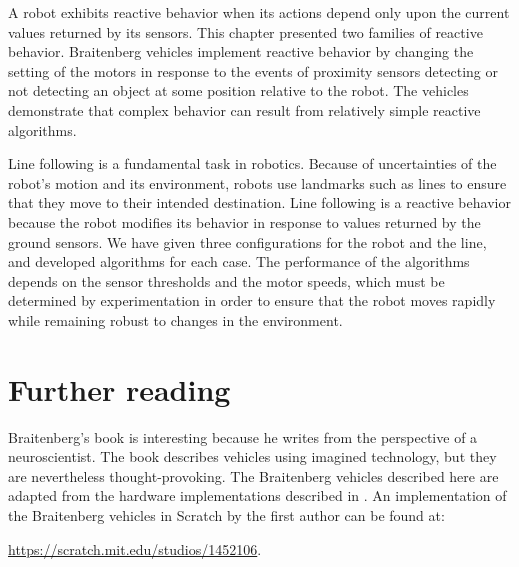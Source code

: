 A robot exhibits reactive behavior when its actions depend only upon the current values returned by its sensors. This chapter presented two families of reactive behavior. Braitenberg vehicles implement reactive behavior by changing the setting of the motors in response to the events of proximity sensors detecting or not detecting an object at some position relative to the robot. The vehicles demonstrate that complex behavior can result from relatively simple reactive algorithms.

Line following is a fundamental task in robotics. Because of uncertainties of the robot's motion and its environment, robots use landmarks such as lines to ensure that they move to their intended destination. Line following is a reactive behavior because the robot modifies its behavior in response to values returned by the ground sensors. We have given three configurations for the robot and the line, and developed algorithms for each case. The performance of the algorithms depends on the sensor thresholds and the motor speeds, which must be determined by experimentation in order to ensure that the robot moves rapidly while remaining robust to changes in the environment.

\section{Further reading}

Braitenberg's book \cite{valentino} is interesting because he writes from the perspective of a neuroscientist. The book describes vehicles using imagined technology, but they are nevertheless thought-provoking. The Braitenberg vehicles described here are adapted from the hardware implementations described in \cite{creatures}. An implementation of the Braitenberg vehicles in Scratch by the first author can be found at:\par\noindent\url{https://scratch.mit.edu/studios/1452106}.




